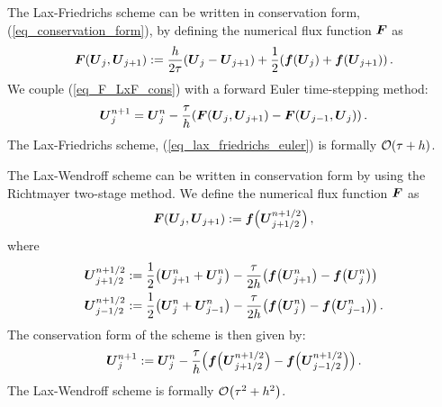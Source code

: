\documentclass[final]{amsart}
\renewcommand{\vect}[1]{\geovec{#1}}
\renewcommand{\vec}[1]{\geovec{#1}}
\numberwithin{equation}{section}
\begin{document}
\begin{Rem}
  The Lax-Friedrichs scheme can be written in conservation form,
  (\ref{eq_conservation_form}), by defining the numerical flux
  function $\vec{F}$ as
  \begin{equation}\label{eq_F_LxF_cons}
     \vect F\qp{ \vect U_j,  \vect U_{j+1}}
    :=
    \frac{h}{2\tau}\qp{ \vec U_j- \vec U_{j+1}}
    +
    \frac{1}{2}\qp{ \vec f\qp{ \vec U_j}+ \vec f\qp{\vect U_{j+1}}}.
  \end{equation}
 We couple  (\ref{eq_F_LxF_cons}) with a forward Euler time-stepping method:
 \begin{equation}\label{eq_lax_friedrichs_euler}
\vec{U}^{n+1}_j = \vec{U}^n_j - \frac{\tau}{h}\qp{  \vec F\qp{ \vec U_j,  \vec U_{j+1}} -  \vec F\qp{ \vec U_{j-1} ,\vec U_{j}}}.
 \end{equation}
The Lax-Friedrichs scheme, (\ref{eq_lax_friedrichs_euler}) is formally $\mathcal{O}\!\left({\tau+h}\right)$.
\end{Rem}

\begin{Rem}
  The Lax-Wendroff scheme can be written in conservation form by
        using the Richtmayer two-stage method.  We define the numerical
        flux function $\vec F$ as
	\begin{equation}\label{eq_F_LxW_cons}
	\vec F\qp{\vec U_j,\vec U_{j+1}}:= \vec f\qp{\vec U^{n+1/2}_{j+1/2}},
	\end{equation}
	where 
	\begin{equation}
	\begin{split}
	\vec U^{n+1/2}_{j+1/2}&:=\frac{1}{2}\qp{\vec U^n_{j+1} + \vec U^n_{j}}-\frac{\tau}{2h}\qp{\vec f\qp{\vec U^n_{j+1}}-\vec f\qp{\vec U^n_j}}\\
	\vec U^{n+1/2}_{j-1/2}&:=\frac{1}{2}\qp{\vec U^n_{j} + \vec U^n_{j-1}}-\frac{\tau}{2h}\qp{\vec f\qp{\vec U^n_{j}}-\vec f\qp{\vec U^n_{j-1}}}.
	\end{split}
	\end{equation}
	The conservation form of the scheme is then given by:
	\begin{equation}\label{eq_LxW_scheme}
	\vec U^{n+1}_j:= \vec  U^n_j-\frac{\tau}{h}\qp{\vec f\qp{\vec U^{n+1/2}_{j+1/2}}-\vec f\qp{\vec U^{n+1/2}_{j-1/2}}}.
	\end{equation}
	The Lax-Wendroff scheme is formally $\mathcal{O}\!\left({\tau^2 +h^2}\right)$. 
\end{Rem}
\end{document}
